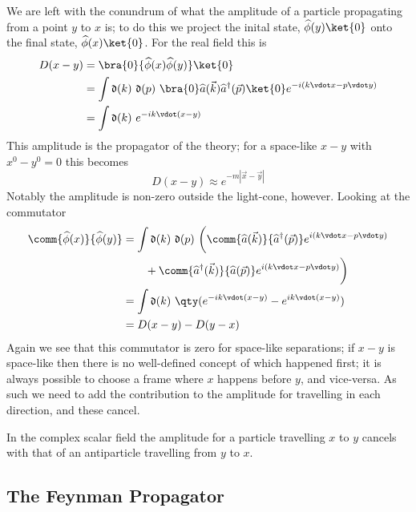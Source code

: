 We are left with the conundrum of what the amplitude of a particle
propagating from a point $y$ to $x$ is; to do this we project the
inital state, $\Op{\phi}(y) \ket{0}$ onto the final state,
$\Op{\phi}(x) \ket{0}$. For the real field this is
\begin{align*}
  D(x-y) &= \bra{0} {\Op{\phi}(x) \Op{\phi}(y)} \ket{0} \\
         &= \int \nm{k} \nm{p} \bra{0} \Op{a}(\vec{k}) \hOp{a}(\vec{p}) \ket{0} e^{-i (k \vdot x - p \vdot y)} \\
         &= \int \nm{k} e^{-ik \vdot(x-y)}
\end{align*}
This amplitude is the propagator of the theory; for a space-like $x-y$
with $x^0 - y^0 = 0$ this becomes
\begin{equation}
  \label{eq:13}
  D(x-y) \approx e^{-m |\vec{x} - \vec{y}|}
\end{equation}
Notably the amplitude is non-zero outside the light-cone, however.
Looking at the commutator
\begin{align*} 
   \comm{\Op{\phi}(x)}{\Op{\phi}(y)} &= \int \nm{k} \nm{p}
                                          \bigg( \comm{\Op{a}(\vec{k})}{\hOp{a}(\vec{p})} e^{i (k \vdot x - p \vdot y)}
                                              \\ & \qquad+ \comm{\hOp{a}(\vec{k})}{\Op{a}(\vec{p})} e^{i (k \vdot x - p \vdot y)} \bigg)\\
                                     &= \int \nm{k} \qty( e^{-ik \vdot(x-y)} - e^{ik \vdot (x-y)}) \\
                                     &= D(x-y) - D(y-x)
 \end{align*}
 Again we see that this commutator is zero for space-like separations;
 if $x-y$ is space-like then there is no well-defined concept of which
 happened first; it is always possible to choose a frame where $x$
 happens before $y$, and vice-versa. As such we need to add the
 contribution to the amplitude for travelling in each direction, and
 these cancel. 

 In the complex scalar field the amplitude for a particle travelling
 $x$ to $y$ cancels with that of an antiparticle travelling from $y$
 to $x$.

\subsection{The Feynman Propagator}
\label{sec:feynman-propagator}

